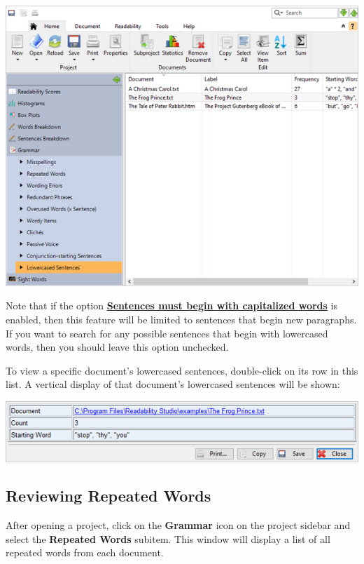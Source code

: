 \documentclass[
]{book}
\theoremstyle{definition}
\theoremstyle{definition}
\theoremstyle{definition}
\theoremstyle{definition}
\theoremstyle{remark}
\begin{document}
\includegraphics{Images/batchlowersentences.png}

Note that if the option \protect\hyperlink{options-sentence-deduction}{\textbf{Sentences must begin with capitalized words}} is enabled, then this feature will be limited to sentences that begin new paragraphs. If you want to search for any possible sentences that begin with lowercased words, then you should leave this option unchecked.

To view a specific document's lowercased sentences, double-click on its row in this list. A vertical display of that document's lowercased sentences will be shown:

\begin{center}\includegraphics[width=0.75\linewidth,]{Images/batchlowersentenceviewitem} \end{center}

\hypertarget{reviewing-batch-repeated-words}{%
\subsection*{Reviewing Repeated Words}\label{reviewing-batch-repeated-words}}

After opening a project, click on the \textbf{Grammar} icon on the project sidebar and select the \textbf{Repeated Words} subitem. This window will display a list of all repeated words from each document.
\end{document}
